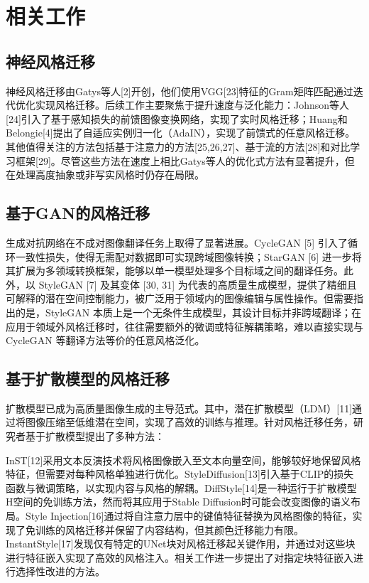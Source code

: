 \documentclass[twocolumn,a4paper,11pt]{ctexart}
\begin{document}
\section{相关工作}

\subsection{神经风格迁移}

神经风格迁移由Gatys等人[2]开创，他们使用VGG[23]特征的Gram矩阵匹配通过迭代优化实现风格迁移。后续工作主要聚焦于提升速度与泛化能力：Johnson等人[24]引入了基于感知损失的前馈图像变换网络，实现了实时风格迁移；Huang和Belongie[4]提出了自适应实例归一化（AdaIN），实现了前馈式的任意风格迁移。其他值得关注的方法包括基于注意力的方法[25,26,27]、基于流的方法[28]和对比学习框架[29]。尽管这些方法在速度上相比Gatys等人的优化式方法有显著提升，但在处理高度抽象或非写实风格时仍存在局限。

\subsection{基于GAN的风格迁移}

生成对抗网络在不成对图像翻译任务上取得了显著进展。CycleGAN [5] 引入了循环一致性损失，使得无需配对数据即可实现跨域图像转换；StarGAN [6] 进一步将其扩展为多领域转换框架，能够以单一模型处理多个目标域之间的翻译任务。此外，以 StyleGAN [7] 及其变体 [30, 31] 为代表的高质量生成模型，提供了精细且可解释的潜在空间控制能力，被广泛用于领域内的图像编辑与属性操作。但需要指出的是，StyleGAN 本质上是一个无条件生成模型，其设计目标并非跨域翻译；在应用于领域外风格迁移时，往往需要额外的微调或特征解耦策略，难以直接实现与 CycleGAN 等翻译方法等价的任意风格泛化。

\subsection{基于扩散模型的风格迁移}

扩散模型已成为高质量图像生成的主导范式。其中，潜在扩散模型（LDM）[11]通过将图像压缩至低维潜在空间，实现了高效的训练与推理。针对风格迁移任务，研究者基于扩散模型提出了多种方法：

InST[12]采用文本反演技术将风格图像嵌入至文本向量空间，能够较好地保留风格特征，但需要对每种风格单独进行优化。StyleDiffusion[13]引入基于CLIP的损失函数与微调策略，以实现内容与风格的解耦。DiffStyle[14]是一种运行于扩散模型H空间的免训练方法，然而将其应用于Stable Diffusion时可能会改变图像的语义布局。Style Injection[16]通过将自注意力层中的键值特征替换为风格图像的特征，实现了免训练的风格迁移并保留了内容结构，但其颜色迁移能力有限。InstantStyle[17]发现仅有特定的UNet块对风格迁移起关键作用，并通过对这些块进行特征嵌入实现了高效的风格注入。相关工作进一步提出了对指定块特征嵌入进行选择性改进的方法。
\end{document}
